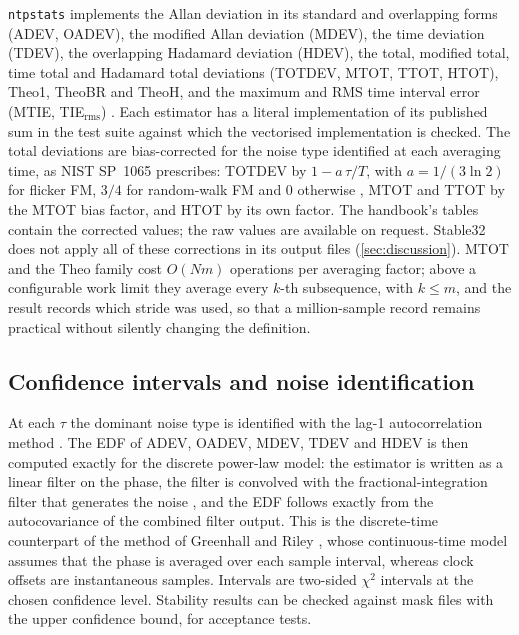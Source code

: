 \documentclass[11pt,a4paper]{article}
\newcommand{\ntp}{\texttt{ntpstats}}
\begin{document}
\ntp{} implements the Allan deviation in its standard and overlapping forms (ADEV, OADEV), the
modified Allan deviation (MDEV), the time deviation (TDEV), the overlapping Hadamard deviation (HDEV),
the total, modified total, time total and Hadamard total deviations (TOTDEV, MTOT, TTOT, HTOT), Theo1,
TheoBR and TheoH, and the maximum and RMS time interval error (MTIE, TIE$_\mathrm{rms}$)
\citep{riley2008,howe2000,howe2003theo,howe2006theoh,g810}. Each estimator has a literal implementation
of its published sum in the test suite against which the vectorised implementation is checked. The
total deviations are bias-corrected for the noise type identified at each averaging time, as NIST
SP~1065 prescribes: TOTDEV by $1 - a\,\tau/T$, with $a = 1/(3\ln 2)$ for flicker FM, $3/4$ for random-walk FM
and 0 otherwise \citep[sec.~5.11]{riley2008}, MTOT and TTOT by the MTOT bias factor, and HTOT by its own
factor. The handbook's tables contain the corrected values; the raw values are available on request.
Stable32 does not apply all of these corrections in its output files (\cref{sec:discussion}). MTOT and the Theo family cost $O(Nm)$ operations per
averaging factor; above a configurable work limit they average every $k$-th subsequence, with
$k \le m$, and the result records which stride was used, so that a million-sample record remains
practical without silently changing the definition.

\subsection{Confidence intervals and noise identification}

At each $\tau$ the dominant noise type is identified with the lag-1 autocorrelation method
\citep{riley2004}. The EDF of ADEV, OADEV, MDEV, TDEV and HDEV is then computed exactly for the discrete
power-law model: the estimator is written as a linear filter on the phase, the filter is convolved with
the fractional-integration filter that generates the noise \citep{kasdin1992,kasdin1995}, and the EDF
follows exactly from the autocovariance of the combined filter output. This is the discrete-time
counterpart of the method of Greenhall and Riley \citep{greenhall2003}, whose continuous-time model
assumes that the phase is averaged over each sample interval, whereas clock offsets are instantaneous
samples.
Intervals are two-sided $\chi^2$ intervals at the chosen confidence level. Stability results can be
checked against mask files with the upper confidence bound, for acceptance tests.
\end{document}
